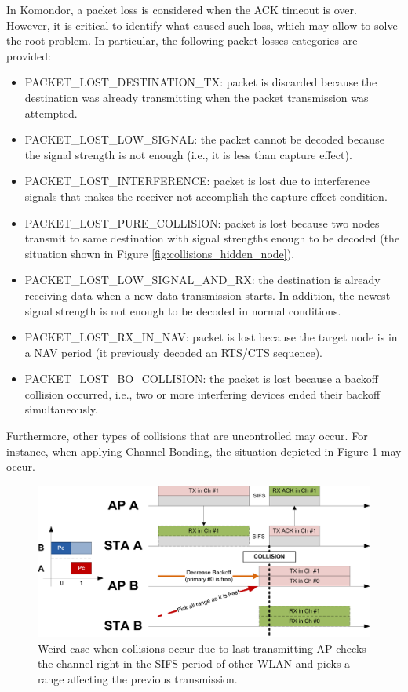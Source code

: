 \documentclass[a4paper]{article}
\begin{document}
	In Komondor, a packet loss is considered when the ACK timeout is over. However, it is critical to identify what caused such loss, which may allow to solve the root problem. In particular, the following packet losses categories are provided:
	\begin{itemize}
		\item PACKET\_LOST\_DESTINATION\_TX: packet is discarded because the destination was already transmitting when the packet transmission was attempted.
		\item PACKET\_LOST\_LOW\_SIGNAL: the packet cannot be decoded because the signal strength is not enough (i.e., it is less than capture effect).
		\item PACKET\_LOST\_INTERFERENCE: packet is lost due to interference signals that makes the receiver not accomplish the capture effect condition.	
		\item PACKET\_LOST\_PURE\_COLLISION: packet is lost because two nodes transmit to same destination with signal strengths enough to be decoded	(the situation shown in Figure \ref{fig:collisions_hidden_node}).	
		\item PACKET\_LOST\_LOW\_SIGNAL\_AND\_RX: the destination is already receiving data when a new data transmission starts. In addition, the newest signal strength is not enough to be decoded in normal conditions.
		\item PACKET\_LOST\_RX\_IN\_NAV: packet is lost because the target node is in a NAV period (it previously decoded an RTS/CTS sequence).		
		\item PACKET\_LOST\_BO\_COLLISION: the packet is lost because a backoff collision occurred, i.e., two or more interfering devices ended their backoff simultaneously.
	\end{itemize}	
	
	Furthermore, other types of collisions that are uncontrolled may occur. For instance, when applying Channel Bonding, the situation depicted in Figure \ref{fig:boat1} may occur.
	\begin{figure}[h!]
		\centering
		\includegraphics[scale=0.7]{images/ACK_issue.png}
		\caption{Weird case when collisions occur due to last transmitting AP checks the channel right in the SIFS period of other WLAN and picks a range affecting the previous transmission.}
		\label{fig:boat1}
	\end{figure}
\end{document}

